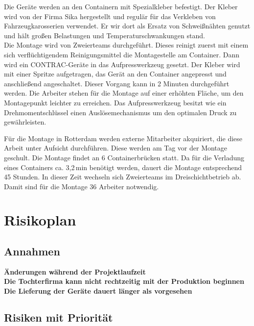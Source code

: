Die Geräte werden an den Containern mit Spezialkleber befestigt. Der Kleber wird von der Firma Sika hergestellt und regulär für das Verkleben von Fahrzeugkarosserien verwendet. Er wir dort als Ersatz von Schweißnähten genutzt und hält großen Belastungen und Temperaturschwankungen stand.\\
Die Montage wird von Zweierteams durchgeführt. Dieses reinigt zuerst mit einem sich verflüchtigendem Reinigungsmittel die Montagestelle am Container. Dann wird ein CONTRAC-Geräte in das Aufpresswerkzeug gesetzt. Der Kleber wird mit einer Spritze aufgetragen, das Gerät an den Container angepresst und anschließend angeschaltet. Dieser Vorgang kann in 2 Minuten durchgeführt werden. Die Arbeiter stehen für die Montage auf einer erhöhten Fläche, um den Montagepunkt leichter zu erreichen. Das Aufpresswerkzeug besitzt wie ein Drehmomentschlüssel einen Auslösemechanismus um den optimalen Druck zu gewährleisten.

Für die Montage in Rotterdam werden externe Mitarbeiter akquiriert, die diese Arbeit unter Aufsicht durchführen. Diese werden am Tag vor der Montage geschult. Die Montage findet an 6 Containerbrücken statt. Da für die Verladung eines Containers ca. 3,2\,min benötigt werden, dauert die Montage entsprechend 45 Stunden. In dieser Zeit wechseln sich Zweierteams im Dreischichtbetrieb ab. Damit sind für die Montage 36 Arbeiter notwendig.


\section{Risikoplan}
\subsection{Annahmen} %

\textbf{Änderungen während der Projektlaufzeit}\\
\textbf{Die Tochterfirma kann nicht rechtzeitig mit der Produktion beginnen}\\
\textbf{Die Lieferung der Geräte dauert länger als vorgesehen}

\subsection{Risiken mit Priorität} %

